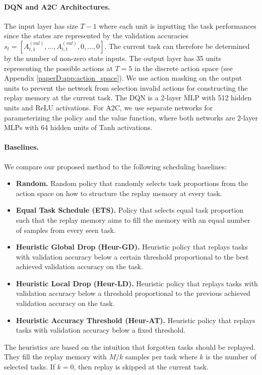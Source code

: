 \vspace{-2mm}
\paragraph{DQN and A2C Architectures.}
The input layer has size $T-1$ where each unit is inputting the task performances since the states are represented by the validation accuracies $s_t = [A_{t, 1}^{(val)}, ..., A_{t, t}^{(val)}, 0, ..., 0]$. The current task can therefore be determined by the number of non-zero state inputs. The output layer has 35 units representing the possible actions at $T=5$ in the discrete action space (see Appendix \ref{paperD:app:action_space}). We use action masking on the output units to prevent the network from selection invalid actions for constructing the replay memory at the current task. The DQN is a 2-layer MLP with 512 hidden units and ReLU activations. For A2C, we use separate networks for parameterizing the policy and the value function, where both networks are 2-layer MLPs with 64 hidden units of Tanh activations. 

\vspace{-2mm}
\paragraph{Baselines.} We compare our proposed method to the following scheduling baselines: 
\begin{itemize}[leftmargin=*, topsep=0pt]
	\item {\bf Random.} Random policy that randomly selects task proportions from the action space on how to structure the replay memory at every task. 
	\item {\bf Equal Task Schedule (ETS).} Policy that selects equal task proportion such that the replay memory aims to fill the memory with an equal number of samples from every seen task. 
	\item {\bf Heuristic Global Drop (Heur-GD).} Heuristic policy that replays tasks with validation accuracy below a certain threshold proportional to the best achieved validation accuracy on the task.
	\item {\bf Heuristic Local Drop (Heur-LD).} Heuristic policy that replays tasks with validation accuracy below a threshold proportional to the previous achieved validation accuracy on the task. 
	\item {\bf Heuristic Accuracy Threshold (Heur-AT).} Heuristic policy that replays tasks with validation accuracy below a fixed threshold. 
	\vspace{-1mm}
\end{itemize}
The heuristics are based on the intuition that forgotten tasks should be replayed. They fill the replay memory with $M/k$ samples per task where $k$ is the number of selected tasks. If $k=0$, then replay is skipped at the current task. 

